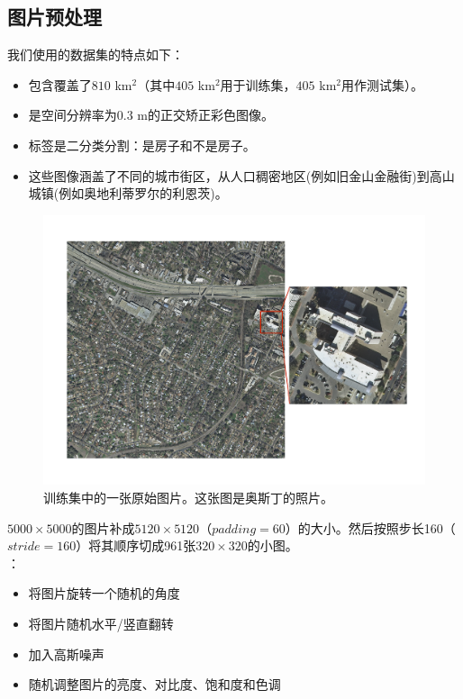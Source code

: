 \documentclass[a4paper,12pt]{article}
\begin{document}
\begin{CJK*}{UTF8}{gbsn}
\begin{spacing}{1.2}
    \section{图片预处理}
    我们使用的数据集的特点如下：
    \begin{itemize}
        \item 包含覆盖了$810$ km$^2$（其中$405$ km$^2$用于训练集，$405$ km$^2$用作测试集）。
        \item 是空间分辨率为$0.3$ m的正交矫正彩色图像。
        \item 标签是二分类分割：是房子和不是房子。
        \item 这些图像涵盖了不同的城市街区，从人口稠密地区(例如旧金山金融街)到高山城镇(例如奥地利蒂罗尔的利恩茨)。
    \end{itemize}
    \begin{figure} [!]
    \centering
    \includegraphics[width=12.0cm]{Austin.pdf}
    \caption{训练集中的一张原始图片。这张图是奥斯丁的照片。}
    \label{fig:Fig 1}
    \end{figure}\par
    $5000\times5000$的图片补成$5120\times5120$（$padding=60$）的大小。然后按照步长160（$stride=160$）将其顺序切成961张$320\times320$的小图。\\
    ：
    \begin{itemize}
        \item 将图片旋转一个随机的角度
        \item 将图片随机水平/竖直翻转
        \item 加入高斯噪声
        \item 随机调整图片的亮度、对比度、饱和度和色调
    \end{itemize}\par

\end{spacing}
\end{CJK*}
\end{document}
